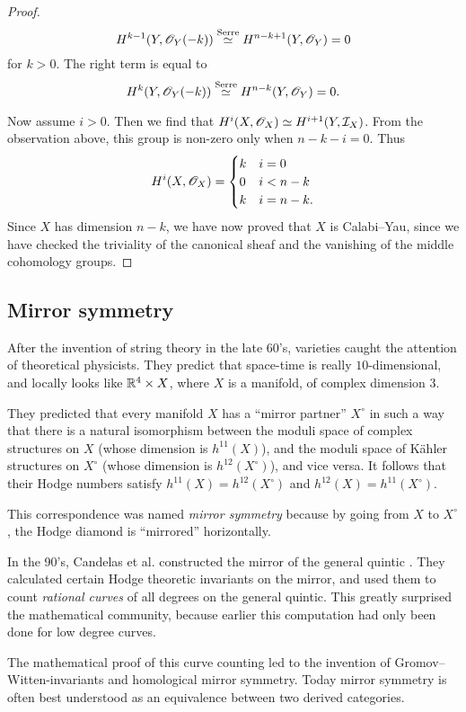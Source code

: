 \begin{proof}
\[
H^{k-1}(Y,\mathscr{O}_Y(-k)) \stackrel{\text{Serre}}{\simeq} H^{n-k+1}(Y,\mathscr{O}_Y)=0\]
for $k > 0$.  The right term is equal to
\[
H^{k}(Y,\mathscr{O}_Y(-k))  \stackrel{\text{Serre}}{\simeq} H^{n-k}(Y,\mathscr{O}_Y)=0.
\]

Now assume $i > 0$. Then we find that $H^i(X,\mathscr{O}_X) \simeq H^{i+1}(Y,\mathcal I_X)$. From the observation above, this group is non-zero only when $n-k-i=0$. Thus
\[
H^i(X,\mathscr{O}_X) = 
\begin{cases}
k &  i = 0 \\
0 & i < n-k \\
k & i =n-k.
\end{cases}
\]
Since $X$ has dimension $n-k$, we have now proved that $X$ is Calabi--Yau, since we have checked the triviality of the canonical sheaf and the vanishing of the middle cohomology groups.
\end{proof}

\subsection{Mirror symmetry}

After the invention of string theory in the late 60's, \CY varieties caught the attention of theoretical physicists. They predict that space-time is really $10$-dimensional, and locally looks like $\mathbb{R}^4 \times X$, where $X$ is a \CY manifold, of complex dimension $3$.

They predicted that every \CY manifold $X$ has a ``mirror partner'' $X^\circ$ in such a way that there is a natural isomorphism between the moduli space of complex structures on $X$ (whose dimension is $h^{11}(X)$), and the moduli space of Kähler structures on $X^\circ$ (whose dimension is $h^{12}(X^\circ)$), and vice versa. It follows that their Hodge numbers satisfy $h^{11}(X) = h^{12}(X^\circ)$ and $h^{12}(X)=h^{11}(X^\circ)$.

This correspondence was named \emph{mirror symmetry} because by going from $X$ to $X^\circ$, the Hodge diamond is ``mirrored'' horizontally.

In the 90's, Candelas et al. constructed the mirror of the general quintic \cite{candelas_string}. They calculated certain Hodge theoretic invariants on the mirror, and used them to count \emph{rational curves} of all degrees on the general quintic. This greatly surprised the mathematical community, because earlier this computation had only been done for low degree curves.

The mathematical proof of this curve counting led to the invention of Gromov--Witten-invariants and homological mirror symmetry. Today mirror symmetry is often best understood as an equivalence between two derived categories.

